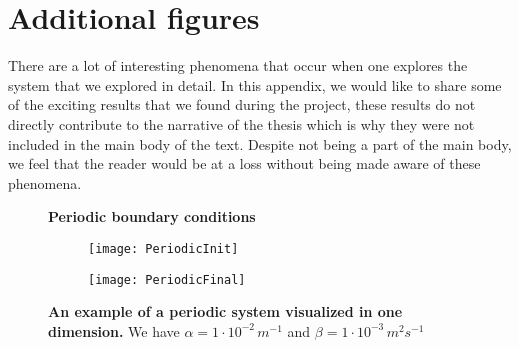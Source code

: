 \chapter{Additional figures}

There are a lot of interesting phenomena that occur when one explores the system that we explored in detail. In this appendix, we would like to share some of the exciting results that we found during the project, these results do not directly contribute to the narrative of the thesis which is why they were not included in the main body of the text. Despite not being a part of the main body, we feel that the reader would be at a loss without being made aware of these phenomena.

\begin{figure}
	\center
	\textbf{Periodic boundary conditions}
	\vspace{0.5cm}

	\begin{subfigure}{0.49\textwidth}
		\texttt{[image: PeriodicInit]}
	\end{subfigure}
	\begin{subfigure}{0.49\textwidth}
		\texttt{[image: PeriodicFinal]}
	\end{subfigure}
	\caption{\textbf{An example of a periodic system visualized in one dimension.} We have $\alpha = 1 \cdot 10^{-2} \, m^{-1}$ and $\beta = 1 \cdot 10^{-3}  \, m^2 s^{-1}$}
\end{figure}